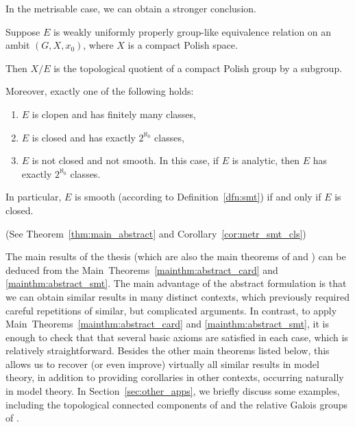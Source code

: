 	In the metrisable case, we can obtain a stronger conclusion.
	\begin{mainthm}
		\label{mainthm:abstract_smt}
		Suppose $E$ is weakly uniformly properly group-like equivalence relation on an ambit $(G,X,x_0)$, where $X$ is a compact Polish space.
		
		Then $X/E$ is the topological quotient of a compact Polish group by a subgroup.
		
		Moreover, exactly one of the following holds:
		\begin{enumerate}
			\item
			$E$ is clopen and has finitely many classes,
			\item
			$E$ is closed and has exactly $2^{\aleph_0}$ classes,
			\item
			$E$ is not closed and not smooth. In this case, if $E$ is analytic, then $E$ has exactly $2^{\aleph_0}$ classes.
		\end{enumerate}
		In particular, $E$ is smooth (according to Definition~\ref{dfn:smt}) if and only if $E$ is closed.
	\end{mainthm}
	(See Theorem~\ref{thm:main_abstract} and Corollary~\ref{cor:metr_smt_cls})
	
	The main results of the thesis (which are also the main theorems of \cite{KPR15} and \cite{KR18}) can be deduced from the Main~Theorems~\ref{mainthm:abstract_card} and \ref{mainthm:abstract_smt}. The main advantage of the abstract formulation is that we can obtain similar results in many distinct contexts, which previously required careful repetitions of similar, but complicated arguments. In contrast, to apply Main~Theorems~\ref{mainthm:abstract_card} and \ref{mainthm:abstract_smt}, it is enough to check that that several basic axioms are satisfied in each case, which is relatively straightforward. Besides the other main theorems listed below, this allows us to recover (or even improve) virtually all similar results in model theory, in addition to providing corollaries in other contexts, occurring naturally in model theory. In Section~\ref{sec:other_apps}, we briefly discuss some examples, including the topological connected components of \cite{KP16} and the relative Galois groups of \cite{DKL17}.
	
